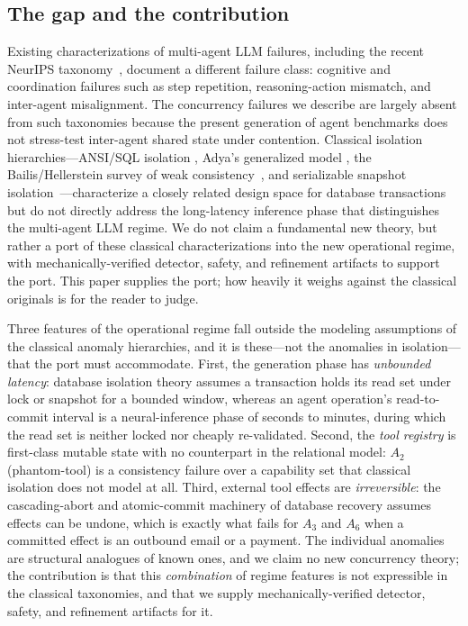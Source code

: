 \documentclass[journal,compsoc,10pt]{IEEEtran}
\providecommand{\citep}{\cite}
\theoremstyle{definition}
\theoremstyle{remark}
\begin{document}
\subsection{The gap and the contribution}
\label{sec:the-gap}
Existing characterizations of multi-agent LLM failures, including the
recent NeurIPS taxonomy~\citep{CemriEtAl2025MAST}, document a different
failure class: cognitive and coordination failures such as step
repetition, reasoning-action mismatch, and inter-agent misalignment.
The concurrency failures we describe are largely absent from such
taxonomies because the present generation of agent benchmarks does
not stress-test inter-agent shared state under contention. Classical
isolation hierarchies---ANSI/SQL isolation
\citep{BerensonEtAl1995}, Adya's generalized model
\citep{Adya1999}, the Bailis/Hellerstein survey of weak
consistency~\citep{BailisGhodsi2013BoltOn}, and serializable
snapshot isolation~\citep{CahillRohmFekete2008SSI}---characterize
a closely related design space for database transactions but do
not directly address the long-latency inference phase that
distinguishes the multi-agent LLM regime. We do not claim a
fundamental new theory, but rather a port of these classical
characterizations into the new operational regime, with
mechanically-verified detector, safety, and refinement artifacts
to support the port. This paper supplies the port; how heavily
it weighs against the classical originals is for the reader to
judge.

\noindent
Three features of the operational regime fall outside the modeling
assumptions of the classical anomaly hierarchies, and it is these---not the
anomalies in isolation---that the port must accommodate. First, the
generation phase has \emph{unbounded latency}: database isolation theory
assumes a transaction holds its read set under lock or snapshot for a
bounded window, whereas an agent operation's read-to-commit interval is a
neural-inference phase of seconds to minutes, during which the read set is
neither locked nor cheaply re-validated. Second, the \emph{tool registry}
is first-class mutable state with no counterpart in the relational model:
$A_2$ (phantom-tool) is a consistency failure over a capability set that
classical isolation does not model at all. Third, external tool effects are
\emph{irreversible}: the cascading-abort and atomic-commit machinery of
database recovery assumes effects can be undone, which is exactly what
fails for $A_3$ and $A_6$ when a committed effect is an outbound email or a
payment. The individual anomalies are structural analogues of known ones,
and we claim no new concurrency theory; the contribution is that this
\emph{combination} of regime features is not expressible in the classical
taxonomies, and that we supply mechanically-verified detector, safety, and
refinement artifacts for it.
\end{document}
